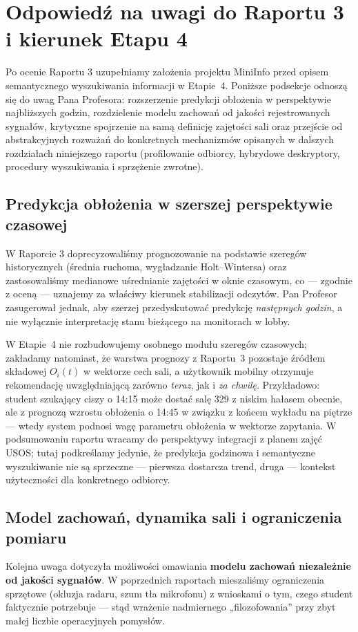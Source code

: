 \documentclass[14pt,a4paper]{extarticle}
\begin{document}
\section{Odpowiedź na uwagi do Raportu 3 i kierunek Etapu 4}

Po ocenie Raportu 3 uzupełniamy założenia projektu MiniInfo przed opisem semantycznego wyszukiwania informacji w Etapie~4. Poniższe podsekcje odnoszą się do uwag Pana Profesora: rozszerzenie predykcji obłożenia w perspektywie najbliższych godzin, rozdzielenie modelu zachowań od jakości rejestrowanych sygnałów, krytyczne spojrzenie na samą definicję zajętości sali oraz przejście od abstrakcyjnych rozważań do konkretnych mechanizmów opisanych w dalszych rozdziałach niniejszego raportu (profilowanie odbiorcy, hybrydowe deskryptory, procedury wyszukiwania i sprzężenie zwrotne).

\subsection{Predykcja obłożenia w szerszej perspektywie czasowej}
W Raporcie 3 doprecyzowaliśmy prognozowanie na podstawie szeregów historycznych (średnia ruchoma, wygładzanie Holt--Wintersa) oraz zastosowaliśmy medianowe uśrednianie zajętości w oknie czasowym, co --- zgodnie z oceną --- uznajemy za właściwy kierunek stabilizacji odczytów. Pan Profesor zasugerował jednak, aby szerzej przedyskutować predykcję \emph{następnych godzin}, a nie wyłącznie interpretację stanu bieżącego na monitorach w lobby.

W Etapie~4 nie rozbudowujemy osobnego modułu szeregów czasowych; zakładamy natomiast, że warstwa prognozy z Raportu~3 pozostaje źródłem składowej $O_i(t)$ w wektorze cech sali, a użytkownik mobilny otrzymuje rekomendację uwzględniającą zarówno \emph{teraz}, jak i \emph{za chwilę}. Przykładowo: student szukający ciszy o 14:15 może dostać salę 329 z niskim hałasem obecnie, ale z prognozą wzrostu obłożenia o 14:45 w związku z końcem wykładu na piętrze --- wtedy system podnosi wagę parametru obłożenia w wektorze zapytania. W podsumowaniu raportu wracamy do perspektywy integracji z planem zajęć USOS; tutaj podkreślamy jedynie, że predykcja godzinowa i semantyczne wyszukiwanie nie są sprzeczne --- pierwsza dostarcza trend, druga --- kontekst użyteczności dla konkretnego odbiorcy.

\subsection{Model zachowań, dynamika sali i ograniczenia pomiaru}
Kolejna uwaga dotyczyła możliwości omawiania \textbf{modelu zachowań niezależnie od jakości sygnałów}. W poprzednich raportach mieszaliśmy ograniczenia sprzętowe (okluzja radaru, szum tła mikrofonu) z wnioskami o tym, czego student faktycznie potrzebuje --- stąd wrażenie nadmiernego „filozofowania” przy zbyt małej liczbie operacyjnych pomysłów.
\end{document}
